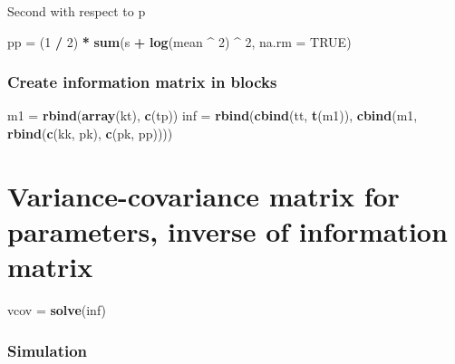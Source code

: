 \documentclass[]{article}
\newenvironment{Shaded}{\begin{snugshade}}{\end{snugshade}}
\newcommand{\DataTypeTok}[1]{\textcolor[rgb]{0.13,0.29,0.53}{#1}}
\newcommand{\DecValTok}[1]{\textcolor[rgb]{0.00,0.00,0.81}{#1}}
\newcommand{\KeywordTok}[1]{\textcolor[rgb]{0.13,0.29,0.53}{\textbf{#1}}}
\newcommand{\NormalTok}[1]{#1}
\newcommand{\OperatorTok}[1]{\textcolor[rgb]{0.81,0.36,0.00}{\textbf{#1}}}
\newcommand{\OtherTok}[1]{\textcolor[rgb]{0.56,0.35,0.01}{#1}}
\newcommand{\StringTok}[1]{\textcolor[rgb]{0.31,0.60,0.02}{#1}}
\begin{document}
Second with respect to p

\begin{Shaded}
\begin{Highlighting}[]
\NormalTok{pp =}\StringTok{ }\NormalTok{(}\DecValTok{1} \OperatorTok{/}\StringTok{ }\DecValTok{2}\NormalTok{) }\OperatorTok{*}\StringTok{ }\KeywordTok{sum}\NormalTok{(s }\OperatorTok{+}\StringTok{ }\KeywordTok{log}\NormalTok{(mean }\OperatorTok{^}\StringTok{ }\DecValTok{2}\NormalTok{) }\OperatorTok{^}\StringTok{ }\DecValTok{2}\NormalTok{, }\DataTypeTok{na.rm =} \OtherTok{TRUE}\NormalTok{)}
\end{Highlighting}
\end{Shaded}

\hypertarget{create-information-matrix-in-blocks}{%
\subsubsection{Create information matrix in
blocks}\label{create-information-matrix-in-blocks}}

\begin{Shaded}
\begin{Highlighting}[]
\NormalTok{m1 =}\StringTok{ }\KeywordTok{rbind}\NormalTok{(}\KeywordTok{array}\NormalTok{(kt), }\KeywordTok{c}\NormalTok{(tp))}
\NormalTok{inf =}\StringTok{ }\KeywordTok{rbind}\NormalTok{(}\KeywordTok{cbind}\NormalTok{(tt, }\KeywordTok{t}\NormalTok{(m1)), }\KeywordTok{cbind}\NormalTok{(m1, }\KeywordTok{rbind}\NormalTok{(}\KeywordTok{c}\NormalTok{(kk, pk), }\KeywordTok{c}\NormalTok{(pk, pp))))}
\end{Highlighting}
\end{Shaded}

\hypertarget{variance-covariance-matrix-for-parameters-inverse-of-information-matrix}{%
\section{Variance-covariance matrix for parameters, inverse of
information
matrix}\label{variance-covariance-matrix-for-parameters-inverse-of-information-matrix}}

\begin{Shaded}
\begin{Highlighting}[]
\NormalTok{vcov =}\StringTok{ }\KeywordTok{solve}\NormalTok{(inf)}
\end{Highlighting}
\end{Shaded}

\hypertarget{simulation}{%
\subsubsection{Simulation}\label{simulation}}
\end{document}
